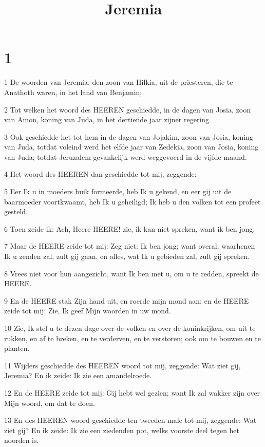 

\title{Jeremia}



\chapter{1}

\par 1 De woorden van Jeremia, den zoon van Hilkia, uit de priesteren, die te Anathoth waren, in het land van Benjamin;
\par 2 Tot welken het woord des HEEREN geschiedde, in de dagen van Josia, zoon van Amon, koning van Juda, in het dertiende jaar zijner regering.
\par 3 Ook geschiedde het tot hem in de dagen van Jojakim, zoon van Josia, koning van Juda, totdat voleind werd het elfde jaar van Zedekia, zoon van Josia, koning van Juda; totdat Jeruzalem gevankelijk werd weggevoerd in de vijfde maand.
\par 4 Het woord des HEEREN dan geschiedde tot mij, zeggende:
\par 5 Eer Ik u in moeders buik formeerde, heb Ik u gekend, en eer gij uit de baarmoeder voortkwaamt, heb Ik u geheiligd; Ik heb u den volken tot een profeet gesteld.
\par 6 Toen zeide ik: Ach, Heere HEERE! zie, ik kan niet spreken, want ik ben jong.
\par 7 Maar de HEERE zeide tot mij: Zeg niet: Ik ben jong; want overal, waarhenen Ik u zenden zal, zult gij gaan, en alles, wat Ik u gebieden zal, zult gij spreken.
\par 8 Vrees niet voor hun aangezicht, want Ik ben met u, om u te redden, spreekt de HEERE.
\par 9 En de HEERE stak Zijn hand uit, en roerde mijn mond aan; en de HEERE zeide tot mij: Zie, Ik geef Mijn woorden in uw mond.
\par 10 Zie, Ik stel u te dezen dage over de volken en over de koninkrijken, om uit te rukken, en af te breken, en te verderven, en te verstoren; ook om te bouwen en te planten.
\par 11 Wijders geschiedde des HEEREN woord tot mij, zeggende: Wat ziet gij, Jeremia? En ik zeide: Ik zie een amandelroede.
\par 12 En de HEERE zeide tot mij: Gij hebt wel gezien; want Ik zal wakker zijn over Mijn woord, om dat te doen.
\par 13 En des HEEREN woord geschiedde ten tweeden male tot mij, zeggende: Wat ziet gij? En ik zeide: Ik zie een ziedenden pot, welks voorste deel tegen het noorden is.
